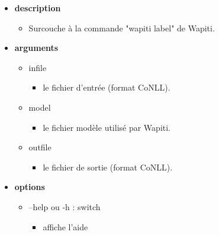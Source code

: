 \documentclass[manual-fr.tex]{subfiles}
\begin{document}
\begin{itemize}
    \item[] \textbf{description}
        \begin{itemize}
            \item[] Surcouche à la commande "wapiti label" de Wapiti.
        \end{itemize}
    \item[] \textbf{arguments}
        \begin{itemize}
            \item[] infile
                \begin{itemize}
                    \item[] le fichier d'entrée (format CoNLL).
                \end{itemize}
            \item[] model
                \begin{itemize}
                    \item[] le fichier modèle utilisé par Wapiti.
                \end{itemize}
            \item[] outfile
                \begin{itemize}
                    \item[] le fichier de sortie (format CoNLL).
                \end{itemize}
        \end{itemize}
    \item[] \textbf{options}
        \begin{itemize}
            \item[] --help ou -h : switch
                \begin{itemize}
                    \item[] affiche l'aide
                \end{itemize}
        \end{itemize}
\end{itemize}
\end{document}
